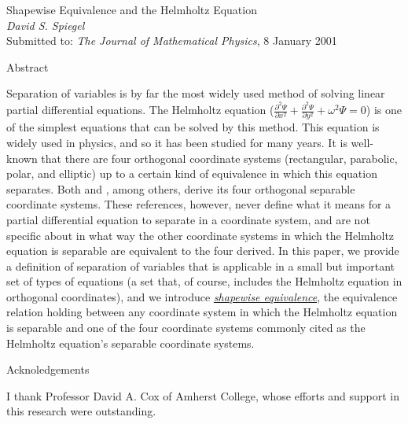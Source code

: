 \documentclass[onecolumn,10pt]{article}
\newcommand{\emu}[1]{\emph{\underline{#1}}}
\newcommand{\parr}[2]{\frac{\partial #1}{\partial #2}}
\begin{document}
\baselineskip 21pt
\evensidemargin 0.25in
\footnotesep 14pt

\begin{center}
\LARGE Shapewise Equivalence and the Helmholtz Equation \\
\normalsize \emph{David S. Spiegel} \\[\medskipamount]
Submitted to: \emph{The Journal of Mathematical Physics}, 8 January 2001 \\

\end{center}

\evensidemargin 0in

\vspace{12pt}

\noindent \LARGE Abstract
\normalsize

\noindent Separation of variables is by far the most widely used method of solving linear partial differential equations.  The Helmholtz equation ($\parr{^2\Psi}{x^2} + \parr{^2\Psi}{y^2} + \omega^2\Psi = 0$) is one of the simplest equations that can be solved by this method.  This equation is widely used in physics, and so it has been studied for many years.  It is well-known that there are four orthogonal coordinate systems (rectangular, parabolic, polar, and elliptic) up to a certain kind of equivalence in which this equation separates.  Both \cite{miller} and \cite{morse}, among others, derive its four orthogonal separable coordinate systems.  These references, however, never define what it means for a partial differential equation to separate in a coordinate system, and are not specific about in what way the other coordinate systems in which the Helmholtz equation is separable are equivalent to the four derived.  In this paper, we provide a definition of separation of variables that is applicable in a small but important set of types of equations (a set that, of course, includes the Helmholtz equation in orthogonal coordinates), and we introduce \emu{shapewise equivalence}, the equivalence relation holding between any coordinate system in which the Helmholtz equation is separable and one of the four coordinate systems commonly cited as the Helmholtz equation's separable coordinate systems.

\newpage



\vspace{12pt}

\noindent \LARGE Acknoledgements
\normalsize

\noindent I thank Professor David A. Cox of Amherst College, whose efforts and support in this research were outstanding.


\end{document}
